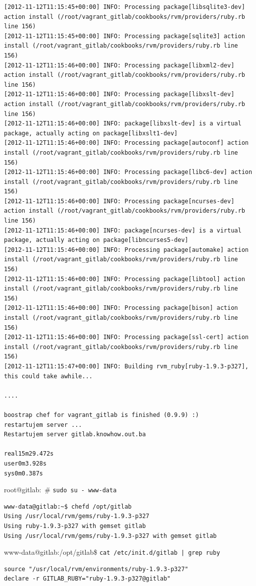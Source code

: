 \documentclass[times, utf8, seminar]{fit}
\begin{document}
\begin{lstlisting}
[2012-11-12T11:15:45+00:00] INFO: Processing package[libsqlite3-dev] action install (/root/vagrant_gitlab/cookbooks/rvm/providers/ruby.rb line 156)
[2012-11-12T11:15:45+00:00] INFO: Processing package[sqlite3] action install (/root/vagrant_gitlab/cookbooks/rvm/providers/ruby.rb line 156)
[2012-11-12T11:15:46+00:00] INFO: Processing package[libxml2-dev] action install (/root/vagrant_gitlab/cookbooks/rvm/providers/ruby.rb line 156)
[2012-11-12T11:15:46+00:00] INFO: Processing package[libxslt-dev] action install (/root/vagrant_gitlab/cookbooks/rvm/providers/ruby.rb line 156)
[2012-11-12T11:15:46+00:00] INFO: package[libxslt-dev] is a virtual package, actually acting on package[libxslt1-dev]
[2012-11-12T11:15:46+00:00] INFO: Processing package[autoconf] action install (/root/vagrant_gitlab/cookbooks/rvm/providers/ruby.rb line 156)
[2012-11-12T11:15:46+00:00] INFO: Processing package[libc6-dev] action install (/root/vagrant_gitlab/cookbooks/rvm/providers/ruby.rb line 156)
[2012-11-12T11:15:46+00:00] INFO: Processing package[ncurses-dev] action install (/root/vagrant_gitlab/cookbooks/rvm/providers/ruby.rb line 156)
[2012-11-12T11:15:46+00:00] INFO: package[ncurses-dev] is a virtual package, actually acting on package[libncurses5-dev]
[2012-11-12T11:15:46+00:00] INFO: Processing package[automake] action install (/root/vagrant_gitlab/cookbooks/rvm/providers/ruby.rb line 156)
[2012-11-12T11:15:46+00:00] INFO: Processing package[libtool] action install (/root/vagrant_gitlab/cookbooks/rvm/providers/ruby.rb line 156)
[2012-11-12T11:15:46+00:00] INFO: Processing package[bison] action install (/root/vagrant_gitlab/cookbooks/rvm/providers/ruby.rb line 156)
[2012-11-12T11:15:46+00:00] INFO: Processing package[ssl-cert] action install (/root/vagrant_gitlab/cookbooks/rvm/providers/ruby.rb line 156)
[2012-11-12T11:15:47+00:00] INFO: Building rvm_ruby[ruby-1.9.3-p327], this could take awhile...

....

boostrap chef for vagrant_gitlab is finished (0.9.9) :)
restartujem server ...
Restartujem server gitlab.knowhow.out.ba

real15m29.472s
user0m3.928s
sys0m0.387s

\end{lstlisting}


root@gitlab:~# \texttt{sudo su - www-data}
\begin{lstlisting}
www-data@gitlab:~$ chefd /opt/gitlab
Using /usr/local/rvm/gems/ruby-1.9.3-p327
Using ruby-1.9.3-p327 with gemset gitlab
Using /usr/local/rvm/gems/ruby-1.9.3-p327 with gemset gitlab
\end{lstlisting}


www-data@gitlab:/opt/gitlab\$ \texttt{cat /etc/init.d/gitlab | grep ruby}
\begin{lstlisting}
source "/usr/local/rvm/environments/ruby-1.9.3-p327"
declare -r GITLAB_RUBY="ruby-1.9.3-p327@gitlab"
\end{lstlisting}
\end{document}
